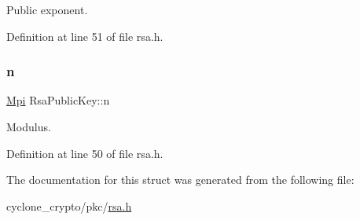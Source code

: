 Public exponent. 



Definition at line 51 of file rsa.\+h.

\mbox{\label{structRsaPublicKey_a51b3d236796d7d46c15d3e6bc7e5acb2}} 
\subsubsection{\texorpdfstring{n}{n}}
{\footnotesize\ttfamily \hyperlink{structMpi}{Mpi} Rsa\+Public\+Key\+::n}



Modulus. 



Definition at line 50 of file rsa.\+h.



The documentation for this struct was generated from the following file\+:\begin{DoxyCompactItemize}
\item 
cyclone\+\_\+crypto/pkc/\hyperlink{rsa_8h}{rsa.\+h}\end{DoxyCompactItemize}
